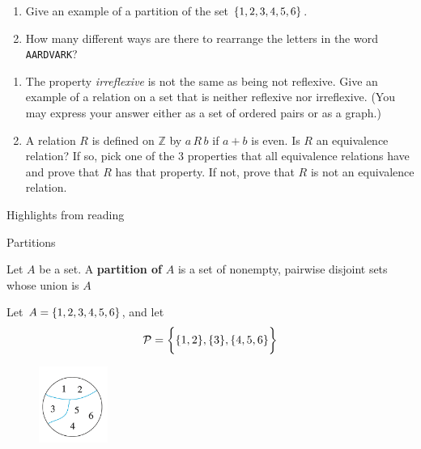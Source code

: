\documentclass[10pt]{beamer}
\begin{document}
\begin{frame}
 \begin{myredbox}[title=Reading Quiz (Partitions)]  
\begin{enumerate}
	\item Give an example of a partition of the set $\{ {1,2,3,4,5,6} \}$.
	\item How many different ways are there to rearrange the letters in the word \texttt{AARDVARK}?
\end{enumerate}
\end{myredbox}
\vfill 
\begin{mygreenbox}[title=Problems Quiz (Relations)]
\begin{enumerate}
\item The property \textit{irreflexive} is not the same as being not reflexive.  Give an example of a relation on a set that is neither reflexive nor irreflexive.   (You may express your answer either as a set of ordered pairs or as a graph.) 
\item A relation $R$ is defined on $\mathbb{Z}$ by $a\,R\,b$ if $a+b$ is even.  Is $R$ an equivalence relation? If so, pick one of the 3 properties that all equivalence relations have and prove that $R$ has that property.  If not, prove that $R$ is not an equivalence relation. 	
\end{enumerate}

\end{mygreenbox}
\vfill 
\end{frame}


\begin{frame}[standout]
Highlights from reading
\end{frame}

\begin{frame}{Partitions}

\begin{mygreenbox}[title=Definition]
Let $A$ be a set.  A \textbf{partition of} $A$ is a set of nonempty, pairwise disjoint sets whose union is $A$	
\end{mygreenbox}
\vfill 
\begin{myredbox}[title=Example]
Let $A = \{ {1,2,3,4,5,6} \}$, and let
\[ \mathcal{P} = \bigg\{ \{ {1,2} \}, \{ {3} \}, \{ {4,5,6} \} \bigg\} \]	

\vfill
\begin{figure}
\includegraphics[width=0.2\textwidth]{images/partition.png}	
\end{figure}
\end{myredbox}

\end{frame}
\end{document}
